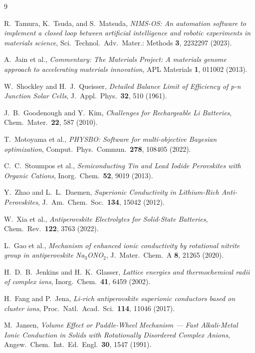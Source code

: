 \documentclass[10pt,twocolumn]{article}
\begin{document}

\begin{thebibliography}{9}

R.~Tamura, K.~Tsuda, and S.~Matsuda,
\textit{NIMS-OS: An automation software to implement a closed loop between
artificial intelligence and robotic experiments in materials science},
Sci.\ Technol.\ Adv.\ Mater.: Methods \textbf{3}, 2232297 (2023).

A.~Jain et al.,
\textit{Commentary: The Materials Project: A materials genome approach to
accelerating materials innovation},
APL Materials \textbf{1}, 011002 (2013).

W.~Shockley and H.~J.~Queisser,
\textit{Detailed Balance Limit of Efficiency of p-n Junction Solar Cells},
J.\ Appl.\ Phys.\ \textbf{32}, 510 (1961).

J.~B.~Goodenough and Y.~Kim,
\textit{Challenges for Rechargeable Li Batteries},
Chem.\ Mater.\ \textbf{22}, 587 (2010).

T.~Motoyama et al.,
\textit{PHYSBO: Software for multi-objective Bayesian optimization},
Comput.\ Phys.\ Commun.\ \textbf{278}, 108405 (2022).

C.~C.~Stoumpos et al.,
\textit{Semiconducting Tin and Lead Iodide Perovskites with Organic Cations},
Inorg.\ Chem.\ \textbf{52}, 9019 (2013).

Y.~Zhao and L.~L.~Daemen,
\textit{Superionic Conductivity in Lithium-Rich Anti-Perovskites},
J.\ Am.\ Chem.\ Soc.\ \textbf{134}, 15042 (2012).

W.~Xia et al.,
\textit{Antiperovskite Electrolytes for Solid-State Batteries},
Chem.\ Rev.\ \textbf{122}, 3763 (2022).

L.~Gao et al.,
\textit{Mechanism of enhanced ionic conductivity by rotational nitrite group in
antiperovskite Na$_3$ONO$_2$},
J.\ Mater.\ Chem.\ A \textbf{8}, 21265 (2020).

H.~D.~B.~Jenkins and H.~K.~Glasser,
\textit{Lattice energies and thermochemical radii of complex ions},
Inorg.\ Chem.\ \textbf{41}, 6459 (2002).

H.~Fang and P.~Jena,
\textit{Li-rich antiperovskite superionic conductors based on cluster ions},
Proc.\ Natl.\ Acad.\ Sci.\ \textbf{114}, 11046 (2017).

M.~Jansen,
\textit{Volume Effect or Paddle-Wheel Mechanism --- Fast Alkali-Metal Ionic
Conduction in Solids with Rotationally Disordered Complex Anions},
Angew.\ Chem.\ Int.\ Ed.\ Engl.\ \textbf{30}, 1547 (1991).

\end{thebibliography}
\end{document}

